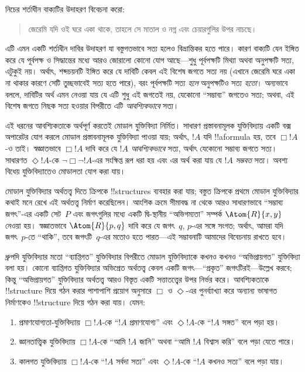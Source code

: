 \documentclass[../../../include/open-logic-section]{subfiles}
\begin{document}


নিচের শর্তাধীন বাক্যটির উদাহরণ বিবেচনা করো:
\begin{quote}
  জেরেমি যদি ওই ঘরে একা থাকে, তাহলে সে মাতাল ও নগ্ন এবং চেয়ারগুলির
  উপর নাচছে।
\end{quote}
এটি এমন একটি শর্তাধীন দাবির উদাহরণ যা বস্তুগতভাবে সত্য হলেও বিভ্রান্তিকর
হতে পারে। কারণ বাক্যটি যেন ইঙ্গিত করে যে পূর্বপক্ষ ও সিদ্ধান্তের মধ্যে
আরও জোরালো কোনো যোগ আছে---শুধু পূর্বপক্ষটি মিথ্যা অথবা অনুপক্ষটি সত্য,
এটুকুই নয়। অর্থাৎ, শব্দচয়নটি ইঙ্গিত করে যে দাবিটি কেবল এই বিশেষ
জগতে সত্য নয় (এখানে জেরেমি ঘরে একা না থাকার কারণে সেটি তুচ্ছভাবেই
সত্য হতে পারে), বরং পূর্বপক্ষটি সত্য \emph{হলে} অনুপক্ষটিও সত্য
\emph{হতো}। অন্যভাবে বললে, দাবিটির অর্থ এমন নেওয়া যায় যে এটি শুধু
এই জগতেই নয়, যেকোনো “সম্ভাব্য” জগতেও সত্য; অথবা, এই বিশেষ জগতে
নিছক সত্য হওয়ার বিপরীতে এটি \emph{আবশ্যিকভাবে} সত্য।

এই ধরনের আবশ্যিকতাকে অর্থপূর্ণ করতেই মোডাল যুক্তিবিদ্যা নির্মিত।
সাধারণ প্রস্তাবনামূলক যুক্তিবিদ্যায় একটি বক্স অপারেটর যোগ করলে মোডাল
প্রস্তাবনামূলক যুক্তিবিদ্যা পাওয়া যায়; অর্থাৎ, $!A$ যদি
!!a{formula} হয়, তবে $\Box !A$-ও তাই। স্বজ্ঞাতভাবে $\Box !A$ দাবি
করে যে $!A$ \emph{আবশ্যিকভাবে} সত্য, অর্থাৎ যেকোনো সম্ভাব্য জগতে
সত্য। সাধারণত $\Diamond !A$-কে $\lnot \Box \lnot !A$-এর সংক্ষিপ্ত
রূপ ধরা হয় এবং এর অর্থ করা যায় যে $!A$ \emph{সম্ভবত} সত্য। অবশ্য
বিধেয় যুক্তিবিদ্যাতেও মোডালতা যোগ করা যায়।

মোডাল যুক্তিবিদ্যার অর্থতত্ত্ব দিতে ক্রিপকে !!{structure}s ব্যবহার
করা যায়; বস্তুত ক্রিপকে প্রথমে মোডাল যুক্তিবিদ্যার কথাই মনে রেখে এই
অর্থতত্ত্ব নির্মাণ করেছিলেন। আংশিক ক্রমে সীমাবদ্ধ না থেকে আরও সাধারণভাবে
“সম্ভাব্য জগৎ”-এর একটি সেট~$P$ এবং জগৎগুলির মধ্যে একটি দ্বি-স্থানীয়
“অভিগম্যতা” সম্পর্ক $\Atom{R}{x,y}$ নেওয়া হয়। স্বজ্ঞাতভাবে
$\Atom{R}{p,q}$ দাবি করে যে জগৎ~$q$, $p$-এর সঙ্গে সংগত; অর্থাৎ, আমরা
যদি জগৎ~$p$-তে “থাকি”, তবে জগৎটি~$q$-এর মতোও হতে পারত---এই
সম্ভাবনাটি আমাদের বিবেচনায় রাখতে হবে।

ধ্রুপদি যুক্তিবিদ্যার মতো “ব্যাপ্তিগত” যুক্তিবিদ্যার বিপরীতে মোডাল
যুক্তিবিদ্যাকে কখনও কখনও “অভিপ্রায়গত” যুক্তিবিদ্যা বলা হয়। কোনো
ব্যাপ্তিগত যুক্তিবিদ্যার অভিপ্রেত অর্থতত্ত্ব কেবল একটি জগৎ---“প্রকৃত”
জগৎটিরই---উল্লেখ করবে; কিন্তু “অভিপ্রায়গত” যুক্তিবিদ্যার অর্থতত্ত্ব
আরও বিস্তৃত একটি সত্তাতত্ত্বের উপর নির্ভর করে। আবশ্যিকতাকে
!!{structure} দিয়ে গঠন করার পাশাপাশি প্রয়োগ অনুসারে $\Box$ ও
$\Diamond$-এর পুনর্ব্যাখ্যা করে অন্যান্য ভাষাগত নির্মাণকেও
!!{structure} দিয়ে গঠন করা যায়। যেমন:
\begin{enumerate}
\item প্রমাণযোগ্যতা-যুক্তিবিদ্যায় $\Box !A$-কে “$!A$ প্রমাণযোগ্য”
  এবং $\Diamond !A$-কে “$!A$ সঙ্গত” বলে পড়া হয়।
\item জ্ঞানতাত্ত্বিক যুক্তিবিদ্যায় $\Box !A$-কে “আমি $!A$ জানি”
  অথবা “আমি $!A$ বিশ্বাস করি” বলে পড়া যেতে পারে।
\item কালগত যুক্তিবিদ্যায় $\Box !A$-কে “$!A$ সর্বদা সত্য” এবং
  $\Diamond !A$-কে “$!A$ কখনও সত্য” বলে পড়া যায়।
\end{enumerate}
\end{document}
